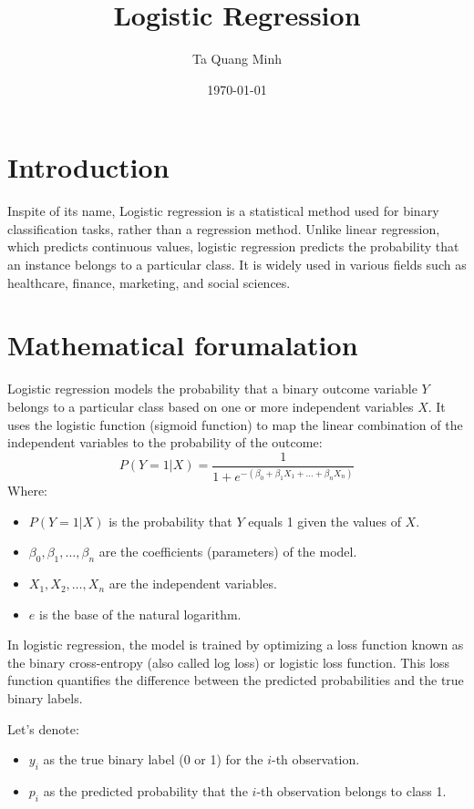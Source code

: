 \documentclass{article}
\title{Logistic Regression}
\author{Ta Quang Minh}
\date{\today}
\begin{document}
\maketitle

\section{Introduction}
Inspite of its name, Logistic regression is a statistical method used for binary classification tasks, rather than a regression method. Unlike linear regression, which predicts continuous values, logistic regression predicts the probability that an instance belongs to a particular class. It is widely used in various fields such as healthcare, finance, marketing, and social sciences.

\section{Mathematical forumalation}
Logistic regression models the probability that a binary outcome variable \( Y \) belongs to a particular class based on one or more independent variables \( X \). It uses the logistic function (sigmoid function) to map the linear combination of the independent variables to the probability of the outcome:
\[
P(Y=1|X) = \frac{1}{1 + e^{-(\beta_0 + \beta_1 X_1 + \ldots + \beta_n X_n)}}
\]
Where:
\begin{itemize}
    \item \( P(Y=1|X) \) is the probability that \( Y \) equals 1 given the values of \( X \).
    \item \( \beta_0, \beta_1, \ldots, \beta_n \) are the coefficients (parameters) of the model.
    \item \( X_1, X_2, \ldots, X_n \) are the independent variables.
    \item \( e \) is the base of the natural logarithm.
\end{itemize}

In logistic regression, the model is trained by optimizing a loss function known as the binary cross-entropy (also called log loss) or logistic loss function. This loss function quantifies the difference between the predicted probabilities and the true binary labels.

Let's denote:
\begin{itemize}
    \item \( y_i \) as the true binary label (0 or 1) for the \( i \)-th observation.
    \item \( p_i \) as the predicted probability that the \( i \)-th observation belongs to class 1.
\end{itemize}
\end{document}
